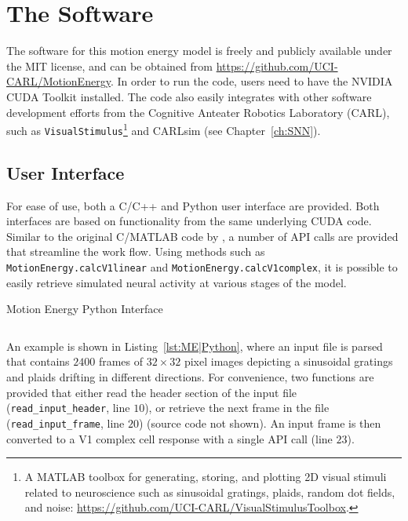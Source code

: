 \section{The Software}
\label{sec:ME|CUDA}
The software for this motion energy model is freely and publicly available 
under the MIT license,
and can be obtained from
\url{https://github.com/UCI-CARL/MotionEnergy}.
In order to run the code, users need to have the NVIDIA \ac{CUDA} Toolkit
installed. 
The code also easily integrates with other software development efforts 
from the Cognitive Anteater Robotics Laboratory (CARL), such as 
\texttt{VisualStimulus}\footnote{A MATLAB toolbox for generating,
storing, and plotting 2D visual stimuli related to neuroscience such 
as sinusoidal gratings, plaids, random dot fields, and noise:
\url{https://github.com/UCI-CARL/VisualStimulusToolbox}.}
and CARLsim (see Chapter~\ref{ch:SNN}).


\subsection{User Interface}
\label{sec:ME|CUDA|UI}

For ease of use, both a C/C++ and Python user interface are provided.
Both interfaces are based on functionality from the same underlying
\ac{CUDA} code.
Similar to the original C/MATLAB code by \cite{SimoncelliHeeger1998}, 
a number of \ac{API} calls are provided that streamline the work flow.
Using methods such as \texttt{MotionEnergy.calcV1linear} and
\texttt{MotionEnergy.calcV1complex}, it is possible to easily retrieve
simulated neural activity at various stages of the model.

\begin{listing}[t]
\caption{Motion Energy Python Interface}
\vspace{-0.7cm}
\inputminted{python}{listings/me_python_ui.py}
\label{lst:ME|Python}
\end{listing}

An example is shown in Listing~\ref{lst:ME|Python}, where an input file is
parsed that contains $2400$ frames of $32 \times 32$ pixel images depicting
a sinusoidal gratings and plaids drifting in different directions.
For convenience, two functions are provided that either read the header section
of the input file (\texttt{read\_input\_header}, line $10$), 
or retrieve the next frame in the file (\texttt{read\_input\_frame}, line $20$)
(source code not shown).
An input frame is then converted to a \ac{V1} complex cell response with a
single \ac{API} call (line $23$).

